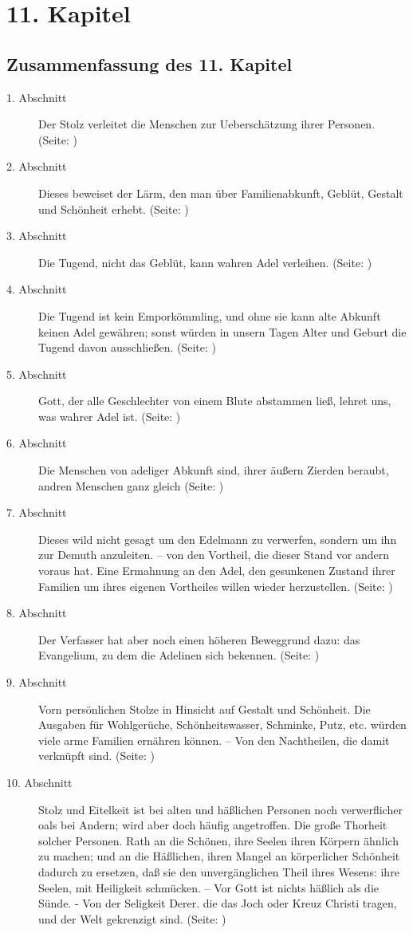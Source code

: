 
\chapter{11. Kapitel} \label{kap11}
\section{Zusammenfassung des 11. Kapitel}
\small
\begin{description}
\item[1. Abschnitt] Der Stolz verleitet die Menschen zur Ueberschätzung ihrer
Personen. (Seite: \pageref{kap11_ab1})
\item[2. Abschnitt] Dieses beweiset der Lärm, den man über Familienabkunft,
Geblüt, Gestalt und Schönheit erhebt. (Seite: \pageref{kap11_ab2})
\item[3. Abschnitt] Die Tugend, nicht das Geblüt, kann wahren Adel verleihen. (Seite: \pageref{kap11_ab3})
\item[4. Abschnitt] Die Tugend ist kein Emporkömmling, und ohne sie kann alte
Abkunft keinen Adel gewähren; sonst würden in unsern Tagen Alter und Geburt die
Tugend davon ausschließen. (Seite: \pageref{kap11_ab4})
\item[5. Abschnitt] Gott, der alle Geschlechter von einem Blute abstammen ließ,
lehret uns, was wahrer Adel ist. (Seite: \pageref{kap11_ab5})
\item[6. Abschnitt] Die Menschen von adeliger Abkunft sind, ihrer äußern Zierden
beraubt, andren Menschen ganz gleich (Seite: \pageref{kap11_ab6})
\item[7. Abschnitt] Dieses wild nicht gesagt um den Edelmann zu verwerfen,
sondern um ihn zur Demuth anzuleiten. – von den Vortheil, die dieser Stand vor
andern voraus hat. Eine Ermahnung an den Adel, den gesunkenen Zustand ihrer
Familien um ihres eigenen Vortheiles willen wieder herzustellen. (Seite: \pageref{kap11_ab7})
\item[8. Abschnitt] Der Verfasser hat aber noch einen höheren Beweggrund dazu:
das Evangelium, zu dem die Adelinen sich bekennen. (Seite: \pageref{kap11_ab8})
\item[9. Abschnitt] Vorn persönlichen Stolze in Hinsicht auf Gestalt und
Schönheit. Die Ausgaben für Wohlgerüche, Schönheitswasser, Schminke, Putz, etc.
würden viele arme Familien ernähren können. -- Von den Nachtheilen, die damit
verknüpft sind. (Seite: \pageref{kap11_ab9})
\item[10. Abschnitt] Stolz und Eitelkeit ist bei alten und häßlichen Personen
noch verwerflicher oals bei Andern; wird aber doch häufig angetroffen. Die große
Thorheit solcher Personen. Rath an die Schönen, ihre Seelen ihren Körpern
ähnlich zu machen; und an die Häßlichen, ihren Mangel an körperlicher Schönheit
dadurch zu ersetzen, daß sie den unvergänglichen Theil ihres Wesens: ihre
Seelen, mit Heiligkeit schmücken. -- Vor Gott ist nichts häßlich als die Sünde.
- Von der Seligkeit Derer. die das Joch oder Kreuz Christi tragen, und der Welt
gekrenzigt sind. (Seite: \pageref{kap11_ab10})

\end{description}
\normalsize

